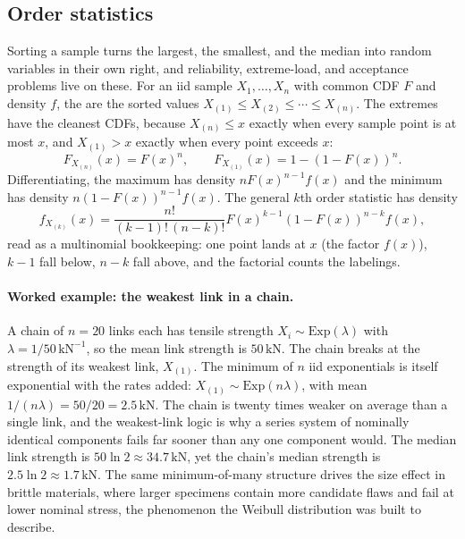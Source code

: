 \subsection{Order statistics}

Sorting a sample turns the largest, the smallest, and the median into
random variables in their own right, and reliability, extreme-load,
and acceptance problems live on these. For an iid sample $X_{1},
\ldots, X_{n}$ with common CDF $F$ and density $f$, the
 are the sorted values $X_{(1)} \leq X_{(2)}
\leq \cdots \leq X_{(n)}$. The extremes have the cleanest CDFs,
because $X_{(n)} \leq x$ exactly when every sample point is at most
$x$, and $X_{(1)} > x$ exactly when every point exceeds $x$:
\[
F_{X_{(n)}}(x) = F(x)^{n}, \qquad
F_{X_{(1)}}(x) = 1 - (1 - F(x))^{n}.
\]
Differentiating, the maximum has density $n F(x)^{n-1} f(x)$ and the
minimum has density $n(1 - F(x))^{n-1} f(x)$. The general $k$th order
statistic has density
\[
f_{X_{(k)}}(x) = \frac{n!}{(k-1)!\,(n-k)!}
F(x)^{k-1} (1 - F(x))^{n-k} f(x),
\]
read as a multinomial bookkeeping: one point lands at $x$ (the factor
$f(x)$), $k-1$ fall below, $n-k$ fall above, and the factorial counts
the labelings.

\paragraph{Worked example: the weakest link in a chain.} A chain of
$n = 20$ links each has tensile strength $X_{i} \sim
\mathrm{Exp}(\lambda)$ with $\lambda = 1/50\,\text{kN}^{-1}$, so the
mean link strength is $50\,\text{kN}$. The chain breaks at the
strength of its weakest link, $X_{(1)}$. The minimum of $n$ iid
exponentials is itself exponential with the rates added:
$X_{(1)} \sim \mathrm{Exp}(n\lambda)$, with mean
$1/(n\lambda) = 50/20 = 2.5\,\text{kN}$. The chain is twenty times
weaker on average than a single link, and the weakest-link logic is
why a series system of nominally identical components fails far sooner
than any one component would. The median link strength is $50 \ln 2
\approx 34.7\,\text{kN}$, yet the chain's median strength is
$2.5 \ln 2 \approx 1.7\,\text{kN}$. The same minimum-of-many structure
drives the size effect in brittle materials, where larger specimens
contain more candidate flaws and fail at lower nominal stress, the
phenomenon the Weibull distribution was built to describe.

